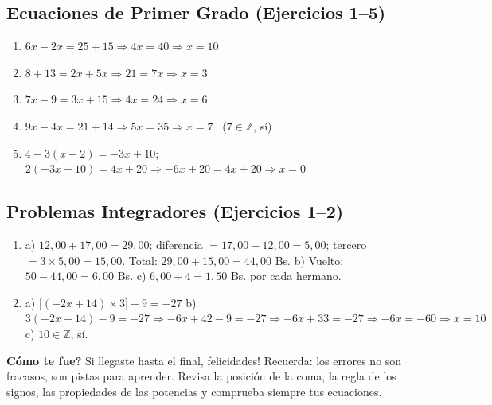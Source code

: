 \documentclass[12pt, letterpaper]{article}
\newcommand{\Z}{\mathbb{Z}}
\begin{document}
  \subsection*{Ecuaciones de Primer Grado (Ejercicios 1--5)}

  \begin{enumerate}[leftmargin=*, label=\textbf{\arabic*.}]
    \item $6x - 2x = 25 + 15 \Rightarrow 4x = 40 \Rightarrow x = 10$ \checkmark
    \item $8 + 13 = 2x + 5x \Rightarrow 21 = 7x \Rightarrow x = 3$ \checkmark
    \item $7x - 9 = 3x + 15 \Rightarrow 4x = 24 \Rightarrow x = 6$
    \item $9x - 4x = 21 + 14 \Rightarrow 5x = 35 \Rightarrow x = 7$ \ ($7 \in \Z$, sí)
    \item $4 - 3(x - 2) = -3x + 10$; $2(-3x + 10) = 4x + 20 \Rightarrow -6x + 20 = 4x + 20 \Rightarrow x = 0$
  \end{enumerate}

  \subsection*{Problemas Integradores (Ejercicios 1--2)}

  \begin{enumerate}[leftmargin=*, label=\textbf{\arabic*.}]
    \item a) $12{,}00 + 17{,}00 = 29{,}00$; diferencia $= 17{,}00 - 12{,}00 = 5{,}00$; tercero $= 3 \times 5{,}00 = 15{,}00$.
          Total: $29{,}00 + 15{,}00 = 44{,}00$ Bs.
          \quad b) Vuelto: $50 - 44{,}00 = 6{,}00$ Bs.
          \quad c) $6{,}00 \div 4 = 1{,}50$ Bs. por cada hermano.
    \item a) $\big[(-2x + 14) \times 3\big] - 9 = -27$
          \quad b) $3(-2x + 14) - 9 = -27 \Rightarrow -6x + 42 - 9 = -27 \Rightarrow -6x + 33 = -27 \Rightarrow -6x = -60 \Rightarrow x = 10$ \checkmark
          \quad c) $10 \in \Z$, sí.
  \end{enumerate}

  \vspace{10pt}
  \begin{cuadrosolucion}
    \textbf{\textquestiondown Cómo te fue?} Si llegaste hasta el final, \textquestiondown felicidades! Recuerda: los errores no son fracasos, son pistas para aprender. Revisa la posición de la coma, la regla de los signos, las propiedades de las potencias y comprueba siempre tus ecuaciones.
  \end{cuadrosolucion}

\fi
\end{document}
